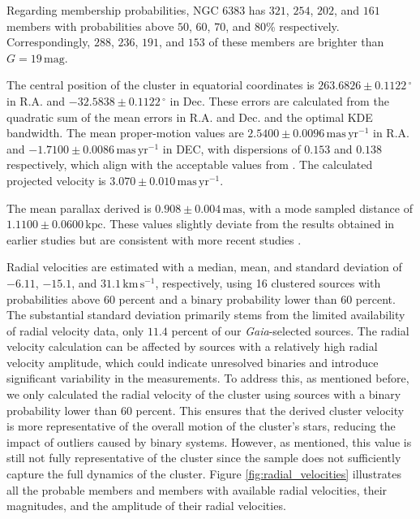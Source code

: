 \documentclass{aa}
\begin{document}
Regarding membership probabilities, NGC 6383 has $321$, $254$, $202$, and $161$ members with probabilities above $50$, $60$, $70$, and $80$\% respectively. Correspondingly, $288$, $236$, $191$, and $153$ of these members are brighter than $G=19\,\mathrm{mag}$.

The central position of the cluster in equatorial coordinates is $263.6826 \pm 0.1122\,^\circ$ in R.A. and $-32.5838 \pm 0.1122\,^\circ$ in Dec. These errors are calculated from the quadratic sum of the mean errors in R.A. and Dec. and the optimal KDE bandwidth. The mean proper-motion values are $2.5400 \pm 0.0096\,\mathrm{mas\,yr^{-1}}$ in R.A. and $-1.7100 \pm 0.0086\,\mathrm{mas\,yr^{-1}}$ in DEC, with dispersions of $0.153$ and $0.138$ respectively, which align with the acceptable values from \citet{2023MNRAS.526.4107P}. The calculated projected velocity is $3.070 \pm 0.010\,\mathrm{mas\,yr^{-1}}$.

The mean parallax derived is $0.908 \pm 0.004\,\mathrm{mas}$, with a mode sampled distance of $1.1100 \pm 0.0600\,\mathrm{kpc}$. These values slightly deviate from the results obtained in earlier studies \citep{1930LicOB..14..154T,1949ApJ...110..117S,1978MNRAS.182..607F,1985AA...151..391T,2007AA...462..157P} but are consistent with more recent studies \citep{1971AAS....4..241B,2005AA...438.1163K,2008AA...477..165P,2021ApJ...923..129J,2022ApJS..262....7H,2024arXiv240301030P,2024arXiv240305143H}.

Radial velocities are estimated with a median, mean, and standard deviation of $-6.11$, $-15.1$, and $31.1 \,\mathrm{km}\,\mathrm{s}^{-1}$, respectively, using 16 clustered sources with probabilities above $60$ percent and a binary probability lower than $60$ percent. The substantial standard deviation primarily stems from the limited availability of radial velocity data, only $11.4$ percent of our \textit{Gaia}-selected sources. The radial velocity calculation can be affected by sources with a relatively high radial velocity amplitude, which could indicate unresolved binaries and introduce significant variability in the measurements. To address this, as mentioned before, we only calculated the radial velocity of the cluster using sources with a binary probability lower than $60$ percent. This ensures that the derived cluster velocity is more representative of the overall motion of the cluster's stars, reducing the impact of outliers caused by binary systems. However, as mentioned, this value is still not fully representative of the cluster since the sample does not sufficiently capture the full dynamics of the cluster. Figure \ref{fig:radial_velocities} illustrates all the probable members and members with available radial velocities, their magnitudes, and the amplitude of their radial velocities.
\end{document}

